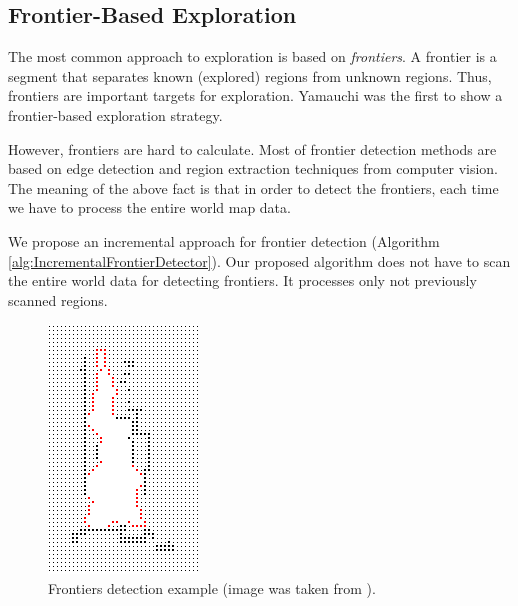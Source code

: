 \documentclass[a4paper,10pt]{article}
\begin{document}




\subsection{Frontier-Based Exploration}
\label{section:FrontierBasedExploration}

The most common approach to exploration is based on \emph{frontiers}. 
A frontier is a segment that separates known (explored) regions from unknown
regions. Thus, frontiers are important targets for exploration. Yamauchi
\cite{yamauchi_frontier-based_1997, yamauchi_frontier-based_1998} was the
first to show a frontier-based exploration strategy.

However, frontiers are hard to calculate. Most of frontier detection methods
are based on edge detection and region extraction techniques from computer
vision. The meaning of the above fact is that in order to detect the frontiers,
each time we have to process the entire world map data.

We propose an incremental approach for frontier detection (Algorithm
\ref{alg:IncrementalFrontierDetector}). Our proposed algorithm does not have to
scan the entire world data for detecting frontiers. It processes only not
previously scanned regions.

\begin{figure}
 \centering
 \includegraphics[width=0.4\columnwidth,keepaspectratio]{images/detect-edges.png}
 \caption{Frontiers detection example (image was taken from 
 \cite{_frontier-based_????}).}
 \label{fig:Frontiers}
\end{figure}
\end{document}
